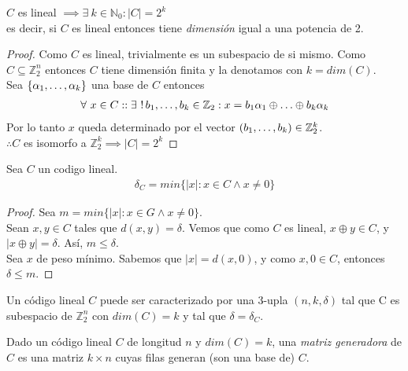 \begin{proposition}
$C$ es lineal $\implies \exists~ k \in \mathbb{N}_0 : \left|C\right| = 2^k$\\
es decir, si $C$ es lineal entonces tiene \emph{dimensión} igual a una potencia de 2.
\end{proposition}
\begin{proof}
Como $C$ es lineal, trivialmente es un subespacio de si mismo. Como $C \subseteq \mathbb{Z}_2^n$ entonces $C$ tiene dimensión finita y la denotamos con $k = dim(C)$.\\
Sea $\{\alpha_1, \mathellipsis, \alpha_k\}$ una base de $C$ entonces
\begin{align}
    \forall~ x\in C :: \exists~!\,b_1, \mathellipsis, b_k \in \mathbb{Z}_2 : x = b_1\alpha_1 \oplus \mathellipsis \oplus b_k \alpha_k
\end{align}
Por lo tanto $x$ queda determinado por el vector $(b_1, \mathellipsis, b_k) \in \mathbb{Z}_2^k$.\\
$\therefore C$ es isomorfo a $\mathbb{Z}_2^k \implies |C| = 2^k$
\end{proof}

\begin{proposition}
Sea $C$ un codigo lineal.
\begin{align}
\delta_C = min\{\left|x\right| : x\in C \wedge x \neq 0\}
\end{align}
\end{proposition}
\begin{proof}
Sea $m = min\{\left|x\right| : x\in G \wedge x \neq 0\}$.\\
Sean $x,y \in C$ tales que $d(x,y) = \delta$. Vemos que como $C$ es lineal, $x \oplus y \in C$, y $\left| x \oplus y \right| = \delta$. Así, $m \le \delta$.\\
 Sea $x$ de peso mínimo. Sabemos que $\left|x\right| = d(x,0)$, y como $x,0 \in C$, entonces $\delta \le m$.
\end{proof}

\begin{definition}
Un código lineal $C$ puede ser caracterizado por una 3-upla $(n, k, \delta)$ tal que C es subespacio de $\mathbb{Z}_2^n$ con $dim(C) = k$ y tal que $\delta = \delta_C$.
\end{definition}

\begin{definition}
Dado un código lineal $C$ de longitud $n$ y $dim(C) = k$, una \emph{matriz generadora} de $C$ es una matriz $k \times n$ cuyas filas generan (son una base de) $C$.\\
\end{definition}

